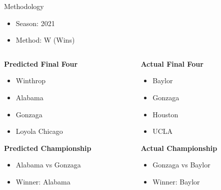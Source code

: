 \documentclass{beamer}
\begin{document}
\begin{frame}{Methodology}
\begin{itemize}
  \item Season: 2021
  \item Method: W (Wins)
\end{itemize}

\begin{columns}[T] %
\begin{column}{0.5\textwidth} %
  \textbf{Predicted Final Four}
  \begin{itemize}
    \item Winthrop
    \item Alabama
    \item Gonzaga
    \item Loyola Chicago
  \end{itemize}
  \textbf{Predicted Championship}
  \begin{itemize}
    \item Alabama vs Gonzaga
    \item Winner: Alabama
    \end{itemize}
\end{column}
\begin{column}{0.5\textwidth} %
  \textbf{Actual Final Four}
  \begin{itemize}
    \item Baylor
    \item Gonzaga
    \item Houston
    \item UCLA
  \end{itemize}
  \textbf{Actual Championship}
  \begin{itemize}
    \item Gonzaga vs Baylor
    \item Winner: Baylor
    \end{itemize}
\end{column}
\end{columns}
\end{frame}
\end{document}
